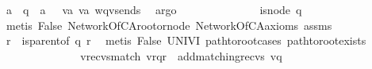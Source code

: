 \begin{isabellebody}
\ {\isacartoucheopen}{\isacharparenleft}{\kern0pt}a\ {\isacharhash}{\kern0pt}\ {\isasymepsilon}{\isacharparenright}{\kern0pt}{\isasymdown}\isactrlsub q\ {\isacharequal}{\kern0pt}\ a\ {\isacharhash}{\kern0pt}\ {\isasymepsilon}{\isacartoucheclose}\ v{\isacharprime}{\kern0pt}a{}\ v{\isacharprime}{\kern0pt}a{}\ wq{\isacharunderscore}{\kern0pt}v{\isacharprime}{\kern0pt}{\isacharunderscore}{\kern0pt}sends\ \isamarkupfalse%
\ argo\isanewline
\ \ \ \ \ \ \ \ \isanewline
\ \ \ \ \isamarkupfalse%
\ {\isachardoublequoteopen}is{\isacharunderscore}{\kern0pt}node\ q{\isachardoublequoteclose}\ \isamarkupfalse%
\ {\isacharparenleft}{\kern0pt}metis\ False\ NetworkOfCA{\isachardot}{\kern0pt}root{\isacharunderscore}{\kern0pt}or{\isacharunderscore}{\kern0pt}node\ NetworkOfCA{\isacharunderscore}{\kern0pt}axioms\ assms{\isacharparenleft}{\kern0pt}{}{\isacharparenright}{\kern0pt}{\isacharparenright}{\kern0pt}\isanewline
\ \ \ \ \isamarkupfalse%
\ \isamarkupfalse%
\ r\ \ {\isachardoublequoteopen}is{\isacharunderscore}{\kern0pt}parent{\isacharunderscore}{\kern0pt}of\ q\ r{\isachardoublequoteclose}\ \isamarkupfalse%
\ {\isacharparenleft}{\kern0pt}metis\ False\ UNIV{\isacharunderscore}{\kern0pt}I\ path{\isacharunderscore}{\kern0pt}to{\isacharunderscore}{\kern0pt}root{\isachardot}{\kern0pt}cases\ path{\isacharunderscore}{\kern0pt}to{\isacharunderscore}{\kern0pt}root{\isacharunderscore}{\kern0pt}exists{\isacharparenright}{\kern0pt}\isanewline
\ \ \ \ \ \ \ \ \isanewline
\ \ \ \ \isamarkupfalse%
\ v{\isacharprime}{\kern0pt}{\isacharunderscore}{\kern0pt}recvs{\isacharunderscore}{\kern0pt}match{\isacharcolon}{\kern0pt}\ {\isachardoublequoteopen}{\isacharparenleft}{\kern0pt}{\isacharparenleft}{\kern0pt}{\isacharparenleft}{\kern0pt}{\isacharquery}{\kern0pt}v{\isacharprime}{\kern0pt}{\isasymdown}\isactrlsub {\isacharbang}{\kern0pt}{\isacharparenright}{\kern0pt}{\isasymdown}\isactrlsub r{\isacharparenright}{\kern0pt}{\isasymdown}\isactrlsub {\isacharbraceleft}{\kern0pt}\isactrlsub q\isactrlsub {\isacharcomma}{\kern0pt}\isactrlsub r\isactrlsub {\isacharbraceright}{\kern0pt}{\isacharparenright}{\kern0pt}{\isasymdown}\isactrlsub {\isacharbang}{\kern0pt}\isactrlsub {\isacharquery}{\kern0pt}\ {\isacharequal}{\kern0pt}\ {\isacharparenleft}{\kern0pt}{\isacharparenleft}{\kern0pt}{\isacharparenleft}{\kern0pt}add{\isacharunderscore}{\kern0pt}matching{\isacharunderscore}{\kern0pt}recvs\ {\isacharparenleft}{\kern0pt}{\isacharparenleft}{\kern0pt}{\isacharquery}{\kern0pt}v{\isacharprime}{\kern0pt}{\isasymdown}\isactrlsub {\isacharbang}{\kern0pt}{\isacharparenright}{\kern0pt}{\isacharparenright}{\kern0pt}{\isasymdown}\isactrlsub {\isacharquery}{\kern0pt}{\isacharparenright}{\kern0pt}{\isasymdown}\isactrlsub q{\isacharparenright}{\kern0pt}{\isasymdown}\isactrlsub {\isacharbang}{\kern0pt}\isactrlsub {\isacharquery}{\kern0pt}{\isacharparenright}{\kern0pt}{\isachardoublequoteclose}\ \isamarkupfalse%

\end{isabellebody}
